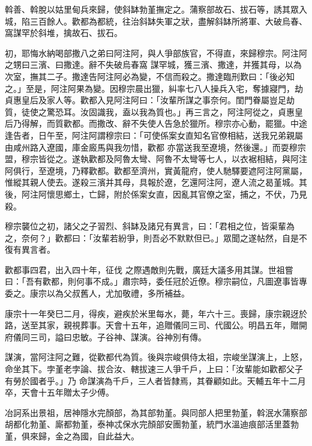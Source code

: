 \begin{pinyinscope}
 斡善、斡脫以姑里甸兵來歸，使斜缽勃堇撫定之。蒲察部故石、拔石等，誘其眾入城，陷三百餘人。歡都為都統，往治斜缽失軍之狀，盡解斜缽所將軍、大破烏春、窩謀罕於斜堆，擒故石、拔石。



 初，耶悔水納喝部撒八之弟曰阿注阿，與人爭部族官，不得直，來歸穆宗。阿注阿之甥曰三濱、曰撒達。辭不失破烏春窩
 謀罕城，獲三濱、撒達，并獲其母，以為次室，撫其二子。撒達告阿注阿必為變，不信而殺之。撒達臨刑歎曰：「後必知之。」至是，阿注阿果為變。因穆宗晨出獵，糾率七八人操兵入宅，奪據寢門，劫貞惠皇后及家人等。歡都入見阿注阿曰：「汝輩所謀之事奈何。閨門眷屬豈足劫質，徒使之驚恐耳。汝固識我，盍以我為質也。」再三言之，阿注阿從之，貞惠皇后乃得解，而質歡都。而撒改、辭不失使人告急於獵所。穆宗亦心動，罷獵。中途逢告者，日午至，阿注阿謂穆宗曰：「可使係案女直知名官僚相結，送我兄弟親屬由咸州路入遼國，庫金廄馬與我勿惜，歡都
 亦當送我至遼境，然後還。」而耍穆宗盟，穆宗皆從之。遂執歡都及阿魯太彎、阿魯不太彎等七人，以衣裾相結，與阿注阿俱行，至遼境，乃釋歡都。歡都至濟州，實黃龍府，使人馳驛要遮阿注阿黨屬，惟縱其親人使去。遂殺三濱并其母，具報於遼，乞還阿注阿，遼人流之曷堇城。其後，阿注阿懷思鄉土，亡歸，附於係案女直，因亂其官僚之室，捕之，不伏，乃見殺。



 穆宗襲位之初，諸父之子習烈、斜缽及諸兄有異言，曰：「君相之位，皆渠輩為之，奈何？」歡都曰：「汝輩若紛爭，則吾必不默默但已。」眾聞之遂帖然，自是不復有異言者。



 歡都事四君，出入四十年，征伐
 之際遇敵則先戰，廣廷大議多用其謀。世祖嘗曰：「吾有歡都，則何事不成。」肅宗時，委任冠於近僚。穆宗嗣位，凡圖遼事皆專委之。康宗以為父叔舊人，尤加敬禮，多所補益。



 康宗十一年癸巳二月，得疾，避疾於米里每水，薨，年六十三。喪歸，康宗親迓於路，送至其家，親視葬事。天會十五年，追贈儀同三司、代國公。明昌五年，贈開府儀同三司，謚曰忠敏。子谷神、謀演。谷神別有傳。



 謀演，當阿注阿之難，從歡都代為質。後與宗峻俱侍太祖，宗峻坐謀演上，上怒，命坐其下。孛堇老孛論、拔合汝、轄拔速三人爭千戶，上曰：「汝輩能如歡都父子有勞於國者乎。」乃
 命謀演為千戶，三人者皆隸焉，其眷顧如此。天輔五年十二月卒，天會十五年贈太子少傅。



 冶訶系出景祖，居神隱水完顏部，為其部勃堇。與同部人把里勃堇，斡泯水蒲察部胡都化勃堇、廝都勃堇，泰神忒保水完顏部安團勃堇，統門水溫迪痕部活里蓋勃堇，俱來歸，金之為國，自此益大。




\end{pinyinscope}
